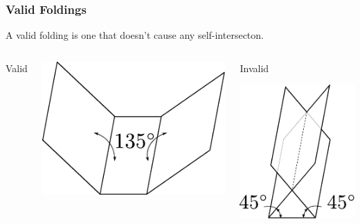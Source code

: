 \documentclass{beamer}
\begin{document}
\begin{frame}
\frametitle{Valid Foldings}
\begin{block}{}
A valid folding is one that doesn't cause any self-intersecton. 
\end{block}
\begin{columns}[c]
\begin{center}
Valid
\end{center}
\includegraphics[width=\textwidth]{knot_pix/folded-valid.pdf}
\begin{center}
Invalid

\includegraphics[width=.6\textwidth]{knot_pix/folded-invalid.pdf}
\end{center}
\end{columns}
\end{frame}
\end{document}
